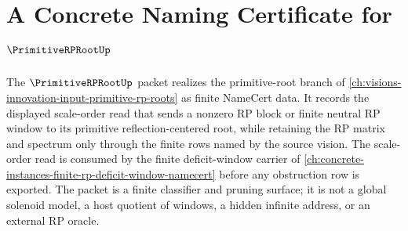 \chapter{A Concrete Naming Certificate for $\PrimitiveRPRootUp$}
\label{ch:concrete-instances-primitive-rp-root-namecert}

The $\PrimitiveRPRootUp$ packet realizes the primitive-root branch of \autoref{ch:visions-innovation-input-primitive-rp-roots} as finite NameCert data. It records the displayed scale-order read that sends a nonzero RP block or finite neutral RP window to its primitive reflection-centered root, while retaining the RP matrix and spectrum only through the finite rows named by the source vision. The scale-order read is consumed by the finite deficit-window carrier of \autoref{ch:concrete-instances-finite-rp-deficit-window-namecert} before any obstruction row is exported. The packet is a finite classifier and pruning surface; it is not a global solenoid model, a host quotient of windows, a hidden infinite address, or an external RP oracle.

